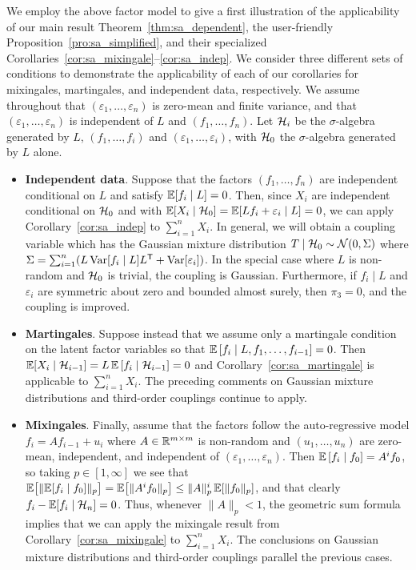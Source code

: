 We employ the above factor model to give a first illustration of the
applicability of our main result Theorem~\ref{thm:sa_dependent}, the
user-friendly Proposition~\ref{pro:sa_simplified}, and their specialized
Corollaries~\ref{cor:sa_mixingale}--\ref{cor:sa_indep}. We
consider three different sets of conditions to demonstrate the applicability of
each of our corollaries for mixingales, martingales, and independent data,
respectively. We assume throughout that
$(\varepsilon_1, \ldots, \varepsilon_n)$ is zero-mean and finite variance, and
that $(\varepsilon_1, \ldots, \varepsilon_n)$ is independent
of $L$ and $(f_1, \ldots, f_n)$. Let $\mathcal{H}_i$ be the $\sigma$-algebra generated
by $L$, $(f_1, \ldots, f_i)$ and $(\varepsilon_1, \ldots, \varepsilon_i)$, with
$\mathcal{H}_0$ the $\sigma$-algebra generated by $L$ alone.

\begin{itemize}
  \item \textbf{Independent data}.
    Suppose that the factors $(f_1, \ldots,
    f_n)$ are independent conditional on $L$ and satisfy
    $\mathbb{E} [ f_i \mid L ] = 0$.
    Then, since $X_i$ are independent conditional on $\mathcal{H}_0$ and with
    $\mathbb{E} [ X_i \mid \mathcal{H}_0 ] = \mathbb{E} [ L f_i + \varepsilon_i \mid L ] = 0$,
    we can apply Corollary~\ref{cor:sa_indep} to $\sum_{i=1}^n X_i$.
    In general, we will obtain a coupling variable which has the Gaussian
    mixture distribution $T \mid \mathcal{H}_0 \sim \mathcal{N}(0, \Sigma)$ where
    $\Sigma= \sum_{i=1}^n (L\operatorname{Var}[f_i \mid L]L^{\mathsf{T}} +\operatorname{Var}[\varepsilon_i])$.
    In the special case where $L$ is non-random
    and $\mathcal{H}_0$ is trivial, the coupling is Gaussian. Furthermore,
    if $f_i\mid L$ and $\varepsilon_i$ are symmetric about zero
    and bounded almost surely, then $\pi_3=0$, and the coupling is improved.

  \item \textbf{Martingales}.
    Suppose instead that we assume only a martingale
    condition on the latent factor variables so that
    $\mathbb{E} \left[ f_i \mid L, f_1, \ldots, f_{i-1} \right] = 0$.
    Then $\mathbb{E} [ X_i \mid \mathcal{H}_{i-1} ]
    = L\, \mathbb{E} \left[ f_i \mid \mathcal{H}_{i-1} \right] = 0$
    and Corollary~\ref{cor:sa_martingale} is applicable to $\sum_{i=1}^n X_i$.
    The preceding comments on Gaussian mixture distributions
    and third-order couplings continue to apply.

  \item \textbf{Mixingales}.
    Finally, assume that the factors follow the
    auto-regressive model $f_i = A f_{i-1} + u_i$ where
    $A \in \mathbb{R}^{m \times m}$ is non-random and $(u_1, \ldots, u_n)$ are
    zero-mean, independent, and independent of
    $(\varepsilon_1, \ldots, \varepsilon_n)$.
    Then $\mathbb{E} \left[ f_i \mid f_0 \right] = A^i f_0$, so taking
    $p \in [1, \infty]$ we see that
    $\mathbb{E} \big[ \| \mathbb{E} [ f_i \mid f_0 ] \|_p \big]
    = \mathbb{E} \big[ \| A^i f_0 \|_p \big] \leq \|A\|_p^i\,\mathbb{E} [ \|f_0\|_p ]$,
    and that clearly $f_i - \mathbb{E} [ f_i \mid \mathcal{H}_n ] = 0$.
    Thus, whenever $\|A\|_p < 1$, the geometric sum formula implies that
    we can apply the mixingale result from Corollary~\ref{cor:sa_mixingale} to
    $\sum_{i=1}^n X_i$. The conclusions on Gaussian mixture distributions
    and third-order couplings parallel the previous cases.
\end{itemize}

